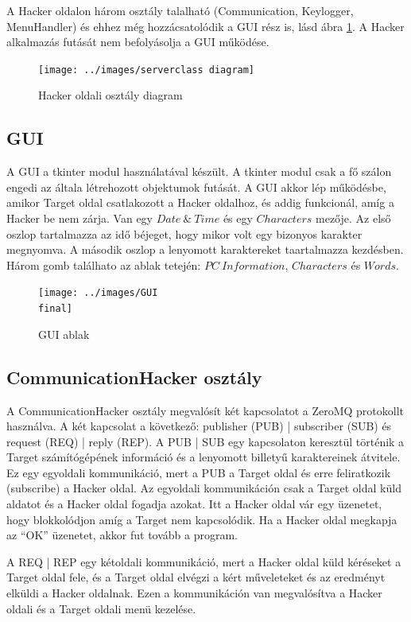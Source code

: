 \documentclass[12pt,a4paper,oneside]{report}
\begin{document}
A Hacker oldalon három osztály talalható (Communication, Keylogger, MenuHandler) és ehhez még hozzácsatolódik a GUI rész is, lásd ábra \ref{fig:serverclassdia}. A Hacker alkalmazás futását nem befolyásolja a GUI működése.
\begin{figure}[H]
\centering
\texttt{[image: ../images/serverclass diagram]}
\caption{Hacker oldali osztály diagram}
\label{fig:serverclassdia}
\end{figure}

\subsection{GUI}\label{subsubsec:gui}
A GUI a tkinter modul használatával készült. A tkinter modul csak a fő szálon engedi az általa létrehozott objektumok futását.
A GUI akkor lép működésbe, amikor Target oldal csatlakozott a Hacker oldalhoz, és addig funkcionál, amíg a Hacker be nem zárja. Van egy $Date\ \&\ Time$ és egy $Characters$ mezője. Az első oszlop tartalmazza az idő béjeget, hogy mikor volt egy bizonyos karakter megnyomva. A második oszlop a lenyomott karaktereket taartalmazza kezdésben. Három gomb találhato az ablak tetején: $PC\ Information$, $Characters$ és $Words$.
\begin{figure}[H]
\centering
\texttt{[image: ../images/GUI\\ final]}
\caption{GUI ablak}
\label{fig:gui}
\end{figure}

\subsection{CommunicationHacker osztály}\label{subsubsec:serverclass}
A CommunicationHacker osztály megvalósít két kapcsolatot a ZeroMQ protokollt használva. A két kapcsolat a következő: publisher (PUB) | subscriber (SUB) és request (REQ) | reply (REP). A PUB | SUB egy kapcsolaton keresztül történik a Target számítógépének információ és a lenyomott billetyű karaktereinek átvitele. Ez egy egyoldali kommunikáció, mert a PUB a Target oldal és erre feliratkozik (subscribe) a Hacker oldal. Az egyoldali kommunikáción csak a Target oldal küld aldatot és a Hacker oldal fogadja azokat. Itt a Hacker oldal vár egy üzenetet, hogy blokkolódjon amíg a Target nem kapcsolódik. Ha a Hacker oldal megkapja az ``OK'' üzenetet, akkor fut tovább a program.

A REQ | REP egy kétoldali kommunikáció, mert a Hacker oldal küld kéréseket a Target oldal fele, és a Target oldal elvégzi a kért műveleteket és az eredményt elküldi a Hacker oldalnak. Ezen a kommunikáción van megvalósítva a Hacker oldali és a Target oldali menü kezelése.
\end{document}
